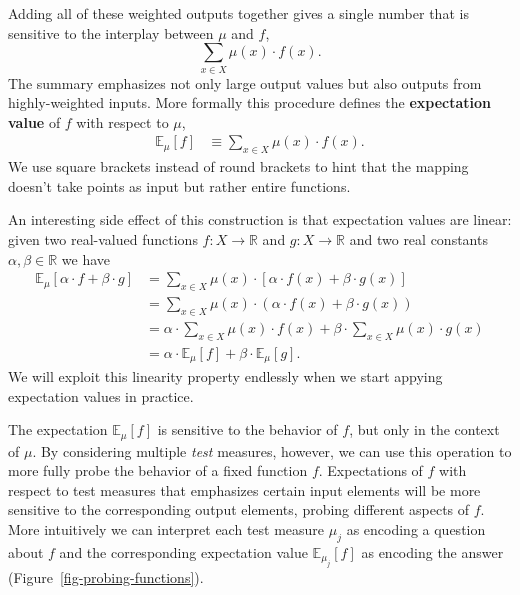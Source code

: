 \documentclass[
  letterpaper,
  DIV=11,
  numbers=noendperiod]{scrartcl}
\begin{document}
Adding all of these weighted outputs together gives a single number that
is sensitive to the interplay between \(\mu\) and \(f\), \[
\sum_{x \in X} \mu(x) \cdot f(x).
\] The summary emphasizes not only large output values but also outputs
from highly-weighted inputs. More formally this procedure defines the
\textbf{expectation value} of \(f\) with respect to \(\mu\),
\begin{align*}
\mathbb{E}_{\mu}[f]
&\equiv \sum_{x \in X} \mu(x) \cdot f(x).
\end{align*} We use square brackets instead of round brackets to hint
that the mapping doesn't take points as input but rather entire
functions.

An interesting side effect of this construction is that expectation
values are linear: given two real-valued functions
\(f: X \rightarrow \mathbb{R}\) and \(g : X \rightarrow \mathbb{R}\) and
two real constants \(\alpha, \beta \in \mathbb{R}\) we have
\begin{align*}
\mathbb{E}_{\mu}[\alpha \cdot f + \beta \cdot g]
&= \sum_{x \in X} \mu(x) \cdot
\left[ \alpha \cdot f(x) + \beta \cdot g(x) \right]
\\
&=  \sum_{x \in X} \mu(x) \cdot
\left( \alpha \cdot f(x) + \beta \cdot g(x) \right)
\\
&=  \alpha \cdot \sum_{x \in X} \mu(x) \cdot f(x)
  + \beta \cdot \sum_{x \in X} \mu(x) \cdot g(x)
\\
&=  \alpha \cdot \mathbb{E}_{\mu}[f]
  + \beta \cdot \mathbb{E}_{\mu}[g].
\end{align*} We will exploit this linearity property endlessly when we
start appying expectation values in practice.

The expectation \(\mathbb{E}_{\mu}[f]\) is sensitive to the behavior of
\(f\), but only in the context of \(\mu\). By considering multiple
\emph{test} measures, however, we can use this operation to more fully
probe the behavior of a fixed function \(f\). Expectations of \(f\) with
respect to test measures that emphasizes certain input elements will be
more sensitive to the corresponding output elements, probing different
aspects of \(f\). More intuitively we can interpret each test measure
\(\mu_{j}\) as encoding a question about \(f\) and the corresponding
expectation value \(\mathbb{E}_{\mu_{j}}[f]\) as encoding the answer
(Figure~\ref{fig-probing-functions}).
\end{document}
